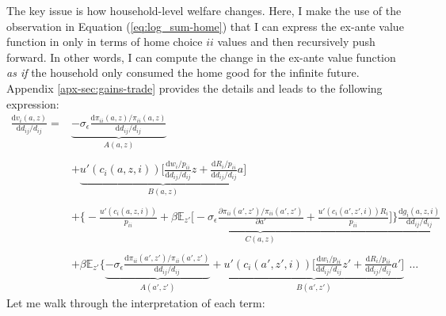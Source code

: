 \documentclass[12pt,pdftex]{article}
\begin{document}
\begin{onehalfspacing}
The key issue is how household-level welfare changes. Here, I make the use of the observation in Equation (\ref{eq:log_sum-home}) that I can express the ex-ante value function in only in terms of home choice $ii$ values and then recursively push forward. In other words, I can compute the change in the ex-ante value function \emph{as if} the household only consumed the home good for the infinite future. Appendix \ref{apx-sec:gains-trade} provides the details and leads to the following expression:
{\small
\begin{align}
\frac{\mathrm{d} v_i(a, z)}{\mathrm{d} d_{ij} / d_{ij}} =& \underbrace{-\sigma_{\epsilon} \frac{\mathrm{d} \pi_{ii}(a,z) / \pi_{ii}(a,z)}{\mathrm{d}d_{ij} / d_{ij}}}_{A(a,z)} \label{eq:welfare-vterms} \\
\nonumber \\
& + \underbrace{u'(c_{i}(a,z,i)) \bigg[ \frac{\mathrm{d} w_{i} / p_{ii}}{\mathrm{d} d_{ij} / d_{ij}}z  +  \frac{\mathrm{d} R_{i} / p_{ii}}{\mathrm{d} d_{ij} / d_{ij}} a  \bigg]}_{B(a,z)} \nonumber \\
\nonumber \\
& + \underbrace{\bigg \{- \frac{u'(c_{i}(a,z,i))}{p_{ii}} + \beta \mathbb{E}_{z'} \bigg [-\sigma_{\epsilon} \frac{\partial \pi_{ii}(a',z') / \pi_{ii}(a',z')}{\partial a'} + \frac{u'(c_{i}(a',z',i))R_{i}}{p_{ii}} \bigg ] \bigg \}\frac{\mathrm{d} g_{i}(a,z,i)}{\mathrm{d} d_{ij} / d_{ij}}}_{C(a,z)} \nonumber \\
\nonumber \\
& + \beta \mathbb{E}_{z'} \bigg \{\underbrace{-\sigma_{\epsilon} \frac{\mathrm{d} \pi_{ii}(a',z') / \pi_{ii}(a',z')}{\mathrm{d}d_{ij} / d_{ij}}}_{A(a',z')} +  \underbrace{u'(c_{i}(a',z',i)) \bigg[ \frac{\mathrm{d} w_{i} / p_{ii}}{\mathrm{d} d_{ij} / d_{ij}}z'  +  \frac{\mathrm{d} R_{i} / p_{ii}}{\mathrm{d} d_{ij} / d_{ij}} a' \bigg]}_{B(a',z')} \ \  \ldots \nonumber
\end{align}
}Let me walk through the interpretation of each term:



\end{onehalfspacing}
\end{document}
